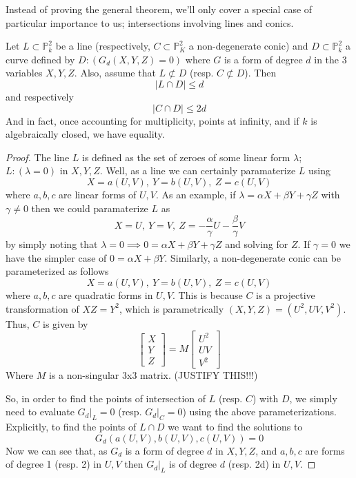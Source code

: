 Instead of proving the general theorem, we'll only cover a special 
case of particular importance to us; intersections involving
lines and conics.

\begin{theorem}
Let $L \subset \mathbb{P}^2_k$ be a line (respectively, $C \subset \mathbb{P}^2_K$ a non-degenerate conic)
and $D \subset \mathbb{P}^2_k$ a curve defined by $D:(G_d(X,Y,Z)=0)$ where $G$ is
a form of degree $d$ in the 3 variables $X,Y,Z$. Also, assume that $L \not\subset D$ (resp. $C \not\subset D$).
Then
\[
|L \cap D| \le d
\]
and respectively
\[
|C \cap D| \le 2d
\]
And in fact, once accounting for multiplicity, points at infinity, and if $k$ is algebraically
closed, we have equality.
\end{theorem}

\begin{proof}
The line $L$ is defined as the set of zeroes of some linear form $\lambda$; $L:(\lambda=0)$
in $X,Y,Z$. Well, as a line we can certainly paramaterize $L$ using 
\[
X=a(U,V),~Y=b(U,V),~Z=c(U,V)
\]
where $a, b, c$ are linear forms of $U,V$. As an example, if $\lambda = \alpha X + \beta Y + \gamma Z$
with $\gamma \ne 0$ then we could paramaterize $L$ as
\[
X = U,~Y=V,~Z=-\frac{\alpha}{\gamma}U - \frac{\beta}{\gamma}V
\]
by simply noting that $\lambda = 0 \implies 0 = \alpha X + \beta Y + \gamma Z$ and solving
for $Z$. If $\gamma = 0$ we have the simpler case of $0 = \alpha X + \beta Y$.
Similarly, a non-degenerate conic can be parameterized as follows
\[
X=a(U,V),~Y=b(U,V),~Z=c(U,V)
\]
where $a,b,c$ are quadratic forms in $U,V$. This is because $C$ is a projective
transformation of $XZ=Y^2$, which is parametrically $(X,Y,Z) = (U^2,UV,V^2)$.
Thus, $C$ is given by 
\[
\begin{bmatrix}
X\\
Y\\
Z
\end{bmatrix}
=
M
\begin{bmatrix}
U^2\\
UV\\
V^2
\end{bmatrix}
\]
Where $M$ is a non-singular 3x3 matrix. (JUSTIFY THIS!!!)

So, in order to find the points of intersection of $L$ (resp. $C$) with $D$,
we simply need to evaluate $G_d|_L=0$ (resp. $G_d|_C=0$) using the above parameterizations.
Explicitly, to find the points of $L \cap D$ we want to find the solutions to
\[
	G_d(a(U,V),b(U,V),c(U,V)) = 0
\]
Now we can see that, as $G_d$ is a form of degree $d$ in $X,Y,Z$, and $a,b,c$ are forms
of degree 1 (resp. 2) in $U,V$ then $G_d|_L$ is of degree $d$ (resp. 2d) in $U,V$.
\end{proof}

